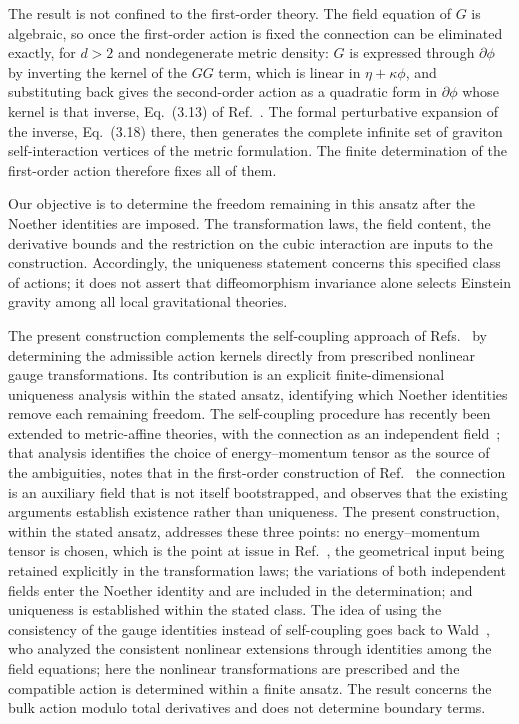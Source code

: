 \documentclass[prd,aps,preprint,superscriptaddress,nofootinbib,amsmath,amssymb,eqsecnum]{revtex4-2}
\begin{document}
The result is not confined to the first-order theory. The field equation of $G$ is
algebraic, so once the first-order action is fixed the connection can be eliminated
exactly, for $d>2$ and nondegenerate metric density: $G$ is expressed through
$\partial\phi$ by inverting the kernel of the $GG$ term, which is linear in
$\eta+\kappa\phi$, and substituting back gives the second-order action as a quadratic form
in $\partial\phi$ whose kernel is that inverse, Eq.~(3.13) of Ref.~\cite{BrandtMcKeon2016}.
The formal perturbative expansion of the inverse, Eq.~(3.18) there,
then generates the complete infinite set of graviton self-interaction vertices of the metric
formulation. The finite determination of the first-order action therefore fixes all of them.

Our objective is to determine the freedom remaining in this ansatz after the Noether
identities are imposed. The transformation laws, the field content, the derivative bounds and
the restriction on the cubic interaction are inputs to the construction. Accordingly, the
uniqueness statement concerns this specified class of actions; it does not assert that
diffeomorphism invariance alone selects Einstein gravity among all local gravitational
theories.

The present construction complements the self-coupling approach of
Refs.~\cite{Deser1970,Deser2010} by determining the admissible action kernels directly from
prescribed nonlinear gauge transformations. Its contribution is an explicit finite-dimensional
uniqueness analysis within the stated ansatz, identifying which Noether identities remove
each remaining freedom. The self-coupling procedure has
recently been extended to metric-affine theories, with the connection as an independent
field~\cite{Delhom2023}; that analysis identifies the choice of energy--momentum tensor as
the source of the ambiguities, notes that in the first-order construction of
Ref.~\cite{Deser1970} the connection is an auxiliary field that is not itself bootstrapped,
and observes that the existing arguments establish existence rather than uniqueness. The
present construction, within the stated ansatz, addresses these three points: no
energy--momentum tensor is chosen, which is the point at issue in
Ref.~\cite{Padmanabhan2008}, the geometrical input being retained explicitly in the
transformation laws; the variations of both independent fields enter the Noether identity
and are included in the determination; and uniqueness is established within the stated
class. The idea of using the consistency of the gauge identities instead of self-coupling
goes back to Wald~\cite{Wald1986}, who analyzed the consistent nonlinear extensions through
identities among the field equations; here the nonlinear transformations are prescribed and
the compatible action is determined within a finite ansatz. The result concerns the bulk action modulo total derivatives and
does not determine boundary terms.
\end{document}
